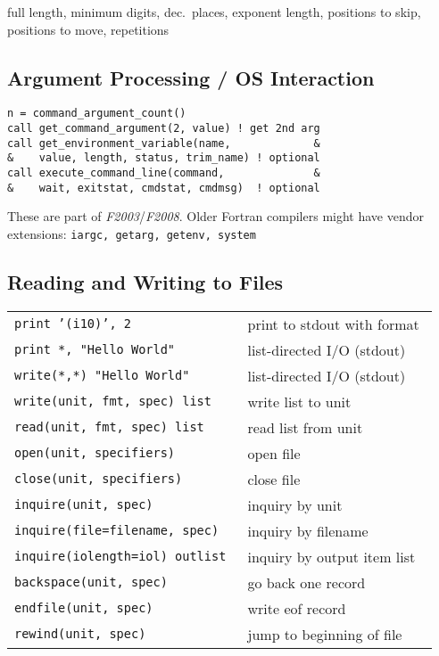 \documentclass[8pt]{extarticle} %
\begin{document}
\begin{multicols}{3}
  \vspace{1ex}
   full length,
   minimum digits,
   dec.\ places,
   exponent length,
   positions to skip,
   positions to move,
   repetitions

  \vspace{1ex}
  \subsection{Argument Processing / OS Interaction}
  \begin{verbatim}
n = command_argument_count()
call get_command_argument(2, value) ! get 2nd arg
call get_environment_variable(name,             &
&    value, length, status, trim_name) ! optional
call execute_command_line(command,              &
&    wait, exitstat, cmdstat, cmdmsg)  ! optional
  \end{verbatim}

  \vspace{-2ex}
  These are part of \textit{F2003}/\textit{F2008}. Older Fortran compilers might
  have vendor extensions: {\tt iargc, getarg, getenv, system}

  \subsection{Reading and Writing to Files}
  \begin{tabular}{L{0.55\linewidth} L{0.45\linewidth}}
  \tt print~'(i10)',~2                            & print to stdout with format \\
  \tt print~*,~"Hello~World"                      & list-directed I/O (stdout)\\
  \tt write(*,*)~"Hello~World"                    & list-directed I/O (stdout)\\
  \tt write(unit,~fmt,~spec)~list                 & write list to unit \\
  \tt read(unit,~fmt,~spec)~list                  & read list from unit \\
  \tt open(unit,~specifiers)                      & open file \\
  \tt close(unit,~specifiers)                     & close file \\
  \tt inquire(unit,~spec)                         & inquiry by unit \\
  \tt inquire(file=filename,~spec)                & inquiry by filename \\
  \tt inquire(iolength=iol)~outlist               & inquiry by output item list \\
  \tt backspace(unit,~spec)                       & go back one record \\
  \tt endfile(unit,~spec)                         & write eof record \\
  \tt rewind(unit,~spec)                          & jump to beginning of file
  \end{tabular}



\end{multicols}
\end{document}
